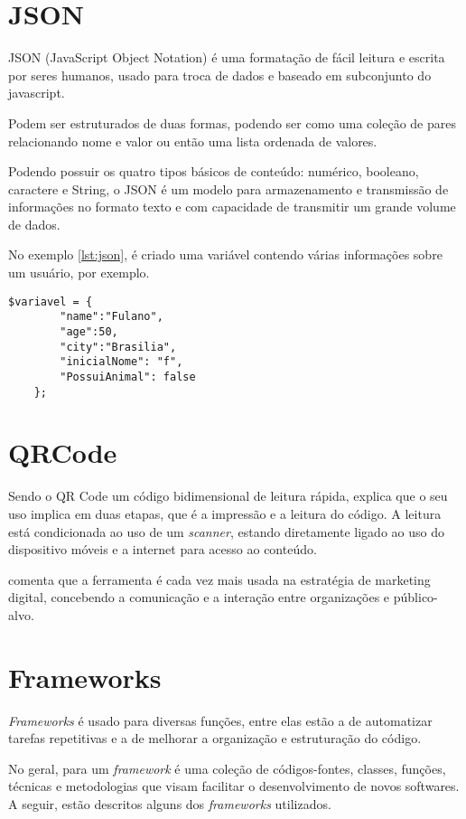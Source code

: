 \section{JSON}
JSON (JavaScript Object Notation) é uma formatação de fácil leitura e escrita por seres humanos, usado para troca de dados e baseado em subconjunto do javascript.

Podem ser estruturados de duas formas, podendo ser como uma coleção de pares relacionando nome e valor ou então uma lista ordenada de valores. 

Podendo possuir os quatro tipos básicos de conteúdo: numérico, booleano, caractere e String, o JSON é um modelo para armazenamento e transmissão de informações no formato texto e com capacidade de transmitir um grande volume de dados.

No exemplo \ref{lst:json}, é criado uma variável contendo várias informações sobre um usuário, por exemplo. 

\begin{lstlisting}[caption={Exemplo de JSON},label={lst:json}]
	$variavel = { 
		"name":"Fulano", 
		"age":50, 
		"city":"Brasilia",
		"inicialNome": "f",
		"PossuiAnimal": false
	};
\end{lstlisting}

\section{QRCode}
Sendo o QR Code um código bidimensional de leitura rápida, \cite{sousa2014} explica que o seu uso implica em duas etapas, que é a impressão e a leitura do código. A leitura está condicionada ao uso de um \textit{scanner}, estando diretamente ligado ao uso do dispositivo móveis e a internet para acesso ao conteúdo.

\cite{sousa2014} comenta que a ferramenta é cada vez mais usada na estratégia de marketing digital, concebendo a comunicação e a interação entre organizações e público-alvo.

\section{Frameworks}
\textit{Frameworks} é usado para diversas funções, entre elas estão a de automatizar tarefas repetitivas e a de melhorar a organização e estruturação do código.  

No geral, para \cite{minetto2007} um \textit{framework} é uma coleção de códigos-fontes, classes, funções, técnicas e metodologias que visam facilitar o desenvolvimento de novos softwares. A seguir, estão descritos alguns dos \textit{frameworks} utilizados.

